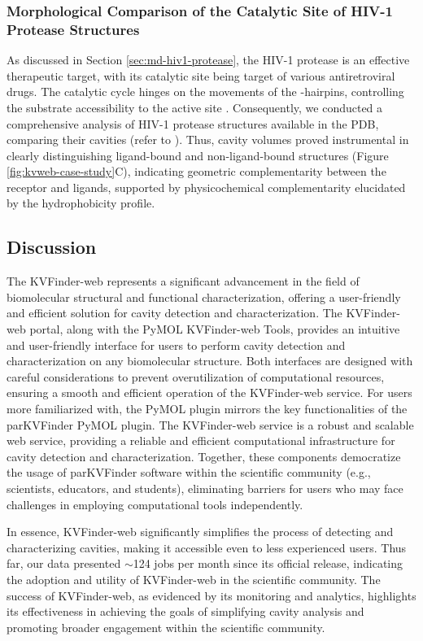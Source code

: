 \documentclass[Ingles]{phdthesis}
\def\eg{e.g.\onedot}
\begin{document}
\subsubsection{Morphological Comparison of the Catalytic Site of HIV-1 Protease Structures}

As discussed in Section \ref{sec:md-hiv1-protease}, the \acs{HIV-1} protease is an effective therapeutic target, with its catalytic site being target of various antiretroviral drugs. The catalytic cycle hinges on the movements of the \textbeta-hairpins, controlling the substrate accessibility to the active site \cite{lam1994,soares2016}. Consequently, we conducted a comprehensive analysis of \acs{HIV-1} protease structures available in the \acs{PDB}, comparing their cavities (refer to \cite{guerra2023A}). Thus, cavity volumes proved instrumental in clearly distinguishing ligand-bound and non-ligand-bound structures (Figure \ref{fig:kvweb-case-study}C), indicating geometric complementarity between the receptor and ligands, supported by physicochemical complementarity elucidated by the hydrophobicity profile.

\subsection{Discussion}

The KVFinder-web represents a significant advancement in the field of biomolecular structural and functional characterization, offering a user-friendly and efficient solution for cavity detection and characterization. The KVFinder-web portal, along with the PyMOL KVFinder-web Tools, provides an intuitive and user-friendly interface for users to perform cavity detection and characterization on any biomolecular structure. Both interfaces are designed with careful considerations to prevent overutilization of computational resources, ensuring a smooth and efficient operation of the KVFinder-web service. For users more familiarized with, the PyMOL plugin mirrors the key functionalities of the parKVFinder PyMOL plugin. The KVFinder-web service is a robust and scalable web service, providing a reliable and efficient computational infrastructure for cavity detection and characterization. Together, these components democratize the usage of parKVFinder software within the scientific community (\eg, scientists, educators, and students), eliminating barriers for users who may face challenges in employing computational tools independently.

In essence, KVFinder-web significantly simplifies the process of detecting and characterizing cavities, making it accessible even to less experienced users. Thus far, our data presented $\sim$124 jobs per month since its official release, indicating the adoption and utility of KVFinder-web in the scientific community. The success of KVFinder-web, as evidenced by its monitoring and analytics, highlights its effectiveness in achieving the goals of simplifying cavity analysis and promoting broader engagement within the scientific community.
\end{document}
